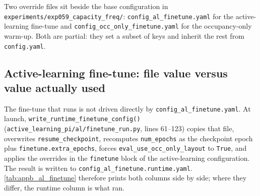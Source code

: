 Two override files sit beside the base configuration in
\texttt{experiments/exp059\_capacity\_freq/}: \texttt{config\_al\_finetune.yaml} for the
active-learning fine-tune and \texttt{config\_occ\_only\_finetune.yaml} for the
occupancy-only warm-up. Both are partial: they set a subset of keys and inherit the rest
from \texttt{config.yaml}.

\subsection{Active-learning fine-tune: file value versus value actually used}
\label{subsec:appb_al_finetune}

The fine-tune that runs is not driven directly by \texttt{config\_al\_finetune.yaml}. At
launch, \texttt{write\_runtime\_finetune\_config()}
(\texttt{active\_learning\_pi/al/finetune\_run.py}, lines 61--123) copies that file,
overwrites \texttt{resume\_checkpoint}, recomputes \texttt{num\_epochs} as the checkpoint
epoch plus \texttt{finetune.extra\_epochs}, forces
\texttt{eval\_use\_occ\_only\_layout} to \texttt{True}, and applies the overrides in the
\texttt{finetune} block of the active-learning configuration. The result is written to
\texttt{config\_al\_finetune.runtime.yaml}. \autoref{tab:appb_al_finetune} therefore
prints both columns side by side; where they differ, the runtime column is what ran.

